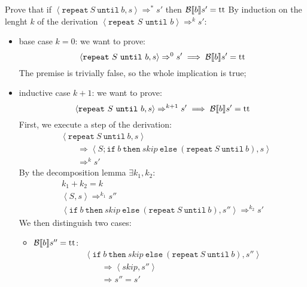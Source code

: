 \begin{exercise}{
    Prove that if $\left<\texttt{repeat}\ S\ \texttt{until}\ b, s\right> \Rightarrow^* s'$ then $\mathcal{B} \llbracket b \rrbracket s' = \text{tt}$
}
    By induction on the lenght $k$ of the derivation $\left<\texttt{repeat } S \texttt{ until } b\right> \Rightarrow^k s'$:
    \begin{itemize}
        \item base case $k=0$: we want to prove:
            \[ \left<\texttt{repeat}\ S\ \texttt{until}\ b,s\right> \Rightarrow^0 s' \implies \Bool{b} s' = \text{tt} \]
            The premise is trivially false, so the whole implication is true;
        \item inductive case $k+1$: we want to prove:
            \[ \left<\texttt{repeat}\ S\ \texttt{until}\ b, s\right> \Rightarrow^{k+1} s' \implies \Bool{b} s' = \text{tt} \]
            First, we execute a step of the derivation:
            \begin{align*}
                &\left<\texttt{repeat}\ S\ \texttt{until}\ b, s\right>
                \\&\qquad \Rightarrow \left<S; \texttt{if}\ b\ \texttt{then}\ skip\ \texttt{else}\ (\texttt{repeat}\ S\ \texttt{until}\ b), s\right>
                \\&\qquad \Rightarrow^k s'
            \end{align*}
            By the decomposition lemma $\exists k_1, k_2 :$
            \begin{gather*}
                k_1 + k_2 = k \\
                \left<S, s\right> \Rightarrow^{k_1} s'' \\
                \left<\texttt{if}\ b\ \texttt{then}\ skip\ \texttt{else}\ (\texttt{repeat}\ S\ \texttt{until}\ b), s''\right> \Rightarrow^{k_2} s'
            \end{gather*}
            We then distinguish two cases:
            \begin{itemize}
                \item $\mathcal{B} \llbracket b \rrbracket s'' = \text{tt}$:
                    \begin{align*}
                        &\left<\texttt{if}\ b\ \texttt{then}\ skip\ \texttt{else}\ (\texttt{repeat}\ S\ \texttt{until}\ b), s''\right>
                        \\&\qquad \Rightarrow \left<skip, s''\right>
                        \\&\qquad \Rightarrow s'' = s'
                    \end{align*}

\end{itemize}
\end{itemize}
\end{exercise}

